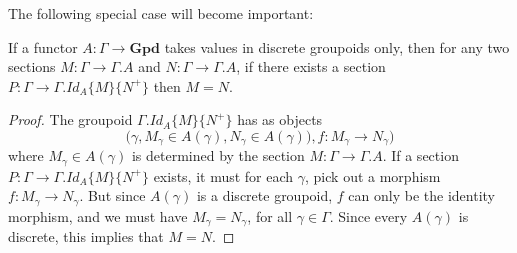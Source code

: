 \documentclass[a4paper,english]{lipics-v2018}
\begin{document}
The following special case will become important:
\begin{lemma}\label{discgroupoid}If a functor $A : \Gamma \to \mathbf{Gpd}$ takes values in discrete groupoids only, then for any two sections $M : \Gamma \to \Gamma.A$ and $N : \Gamma \to \Gamma.A$, if there exists a section $P : \Gamma \to \Gamma.Id_A\{M\}\{N^+\}$ then $M = N$.
\begin{proof}
The groupoid $\Gamma.Id_A\{M\}\{N^+\}$ has as objects 
\[
\big (\gamma, M_\gamma \in A(\gamma), N_\gamma \in A(\gamma)), f : M_\gamma \to N_\gamma\big )
\]
where $M_\gamma \in A(\gamma)$ is determined by the section $M : \Gamma \to \Gamma.A$.
If a section $P : \Gamma \to \Gamma.Id_A\{M\}\{N^+\}$ exists, it must for each $\gamma$, pick out a morphism $f : M_\gamma \to N_\gamma$. But since $A(\gamma)$ is a discrete groupoid, $f$ can only be the identity morphism, and we must have $M_\gamma = N_\gamma$, for all $\gamma \in \Gamma$. Since every $A(\gamma)$ is discrete, this implies that $M = N$.
\end{proof}
\end{lemma}
\end{document}
